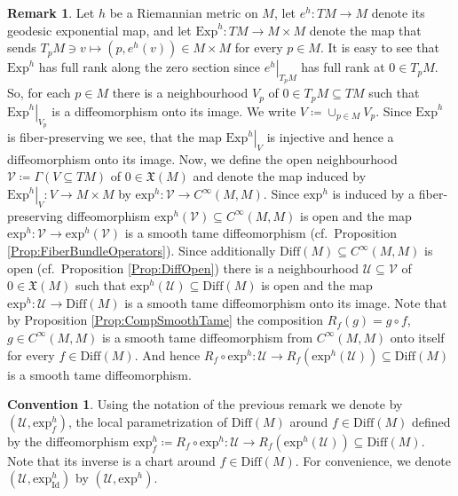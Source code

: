 \documentclass[12pt,a4paper]{article}
\theoremstyle{plain}
\theoremstyle{definition}
\newtheorem{remark}[theorem]{Remark}
\newtheorem{convention}[theorem]{Convention}
\newcommand{\VFs}{\mathfrak{X}(M)}
\newcommand{\Diff}{\mathrm{Diff}(M)}
\newcommand{\eh}[1]{\mathrm{exp}^h(#1)}
\newcommand{\exh}{\mathrm{exp}^h}
\newcommand{\Id}{\mathrm{Id}}
\newcommand{\Ucal}{\mathcal{U}}
\newcommand{\Vcal}{\mathcal{V}}
\begin{document}
\begin{remark}
Let $h$ be a Riemannian metric on $M$, let $e^h:TM\to M$ denote its geodesic exponential map, and let $\mathrm{Exp}^h:TM\to M\times M$ denote the map that sends $T_pM\ni v\mapsto (p,e^h(v))\in M\times M$ for every $p\in M$. It is easy to see that $\mathrm{Exp}^h$ has full rank along the zero section since $\left.e^h\right|_{T_pM}$ has full rank at $0\in T_pM$.
So, for each $p\in M$ there is a neighbourhood $V_p$ of $0\in T_pM\subseteq TM$ such that $\left.\mathrm{Exp}^h\right|_{V_p}$ is a diffeomorphism onto its image. We write $V\coloneqq \cup_{p\in M}V_p$. Since $\mathrm{Exp}^h$
is fiber-preserving we see, that the map $\left.\mathrm{Exp}^h\right|_V$ is injective and hence a diffeomorphism onto its image. Now, we define the open neighbourhood $\Vcal\coloneqq \Gamma(V\subseteq TM)$ of $0\in \VFs$ and denote the map induced by $\left.\mathrm{Exp}^h\right|_V:V\to M\times M$ by
$\exh:\Vcal\to C^\infty(M,M)$. Since $\exh$ is induced by a fiber-preserving diffeomorphism $\eh{\Vcal}\subseteq C^\infty(M,M)$ is open and the map $\exh:\Vcal\to \exh(\Vcal)$ is a smooth tame diffeomorphism (cf.~Proposition \ref{Prop:FiberBundleOperators}). Since additionally $\Diff\subseteq C^\infty(M,M)$ is open (cf.~Proposition \ref{Prop:DiffOpen}) there is a neighbourhood $\Ucal\subseteq \Vcal$ of $0\in \VFs$ such that $\exh(\Ucal)\subseteq \Diff$ is open and the map $\exh:\Ucal \to \Diff$ is a smooth tame diffeomorphism onto its image. Note that by Proposition \ref{Prop:CompSmoothTame} the composition $R_f(g)=g\circ f$, $g\in C^\infty(M,M)$ is a smooth tame diffeomorphism from $C^\infty(M,M)$ onto itself for every $f\in \Diff$. And hence $R_f\circ\exh:\Ucal\to R_f(\eh{\Ucal})\subseteq \Diff$ is a smooth tame diffeomorphism.
\end{remark}

\begin{convention}
\label{Conv:ChartsOnDiff}
Using the notation of the previous remark we denote by $(\Ucal,\exh_f)$, the local parametrization of $\Diff$ around $f\in \Diff$ defined by the diffeomorphism $\exh_f\coloneqq R_f\circ\exh:\Ucal\to R_f(\eh{\Ucal})\subseteq \Diff$. Note that its inverse is a chart around $f\in \Diff$. For convenience, we denote $(\Ucal,\exh_{\Id})$ by $(\Ucal,\exh)$.
\end{convention}
\end{document}
